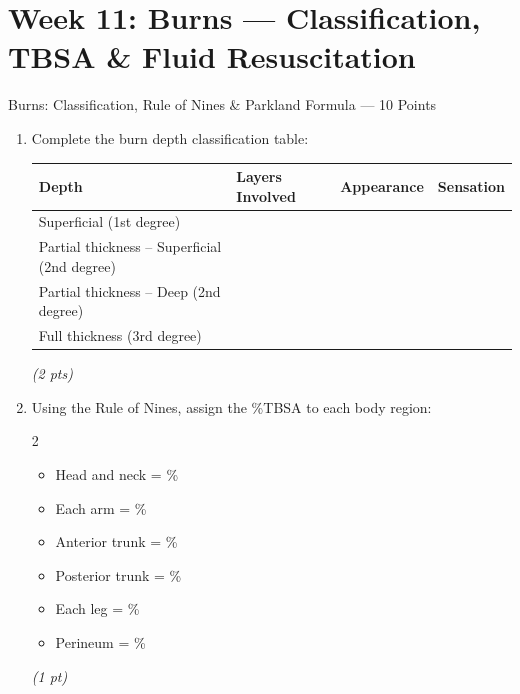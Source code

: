 \documentclass[11pt,letterpaper]{article}
\newcommand{\blank}[1][3cm]{\underline{\hspace{#1}}}
\begin{document}
\newpage


\section{Week 11: Burns --- Classification, TBSA \& Fluid Resuscitation}

\begin{diagbox}{Burns: Classification, Rule of Nines \& Parkland Formula --- 10 Points}

\begin{enumerate}[leftmargin=1.5em, label=\textbf{\arabic*.},start=111]

  \item Complete the burn depth classification table:

  \vspace{0.3cm}
  \begin{center}
  \renewcommand{\arraystretch}{1.7}
  \begin{tabular}{|p{3cm}|p{3.5cm}|p{3.5cm}|p{2.5cm}|}
  \hline
  \textbf{Depth} & \textbf{Layers Involved} & \textbf{Appearance} & \textbf{Sensation} \\
  \hline
  Superficial (1st degree) & \blank[3cm] & \blank[3cm] & \blank[2cm] \\
  \hline
  Partial thickness -- Superficial (2nd degree) & \blank[3cm] & \blank[3cm] & \blank[2cm] \\
  \hline
  Partial thickness -- Deep (2nd degree) & \blank[3cm] & \blank[3cm] & \blank[2cm] \\
  \hline
  Full thickness (3rd degree) & \blank[3cm] & \blank[3cm] & \blank[2cm] \\
  \hline
  \end{tabular}
  \end{center}
  \hfill\textit{(2 pts)}

  \item Using the Rule of Nines, assign the \%TBSA to each body region:
        \begin{multicols}{2}
        \begin{itemize}[leftmargin=1em]
          \item Head and neck = \blank[1.5cm]\%
          \item Each arm = \blank[1.5cm]\%
          \item Anterior trunk = \blank[1.5cm]\%
          \item Posterior trunk = \blank[1.5cm]\%
          \item Each leg = \blank[1.5cm]\%
          \item Perineum = \blank[1.5cm]\%
        \end{itemize}
        \end{multicols}
        \hfill\textit{(1 pt)}


\end{enumerate}
\end{diagbox}
\end{document}

